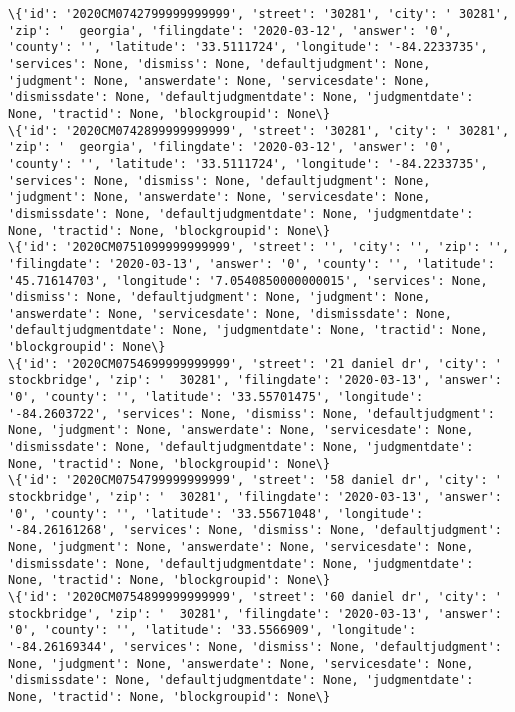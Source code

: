 \documentclass[11pt]{article}
\begin{document}
\begin{Verbatim}[commandchars=\\\{\}]
\{'id': '2020CM0742799999999999', 'street': '30281', 'city': ' 30281', 'zip': '  georgia', 'filingdate': '2020-03-12', 'answer': '0', 'county': '', 'latitude': '33.5111724', 'longitude': '-84.2233735', 'services': None, 'dismiss': None, 'defaultjudgment': None, 'judgment': None, 'answerdate': None, 'servicesdate': None, 'dismissdate': None, 'defaultjudgmentdate': None, 'judgmentdate': None, 'tractid': None, 'blockgroupid': None\}
\{'id': '2020CM0742899999999999', 'street': '30281', 'city': ' 30281', 'zip': '  georgia', 'filingdate': '2020-03-12', 'answer': '0', 'county': '', 'latitude': '33.5111724', 'longitude': '-84.2233735', 'services': None, 'dismiss': None, 'defaultjudgment': None, 'judgment': None, 'answerdate': None, 'servicesdate': None, 'dismissdate': None, 'defaultjudgmentdate': None, 'judgmentdate': None, 'tractid': None, 'blockgroupid': None\}
\{'id': '2020CM0751099999999999', 'street': '', 'city': '', 'zip': '', 'filingdate': '2020-03-13', 'answer': '0', 'county': '', 'latitude': '45.71614703', 'longitude': '7.0540850000000015', 'services': None, 'dismiss': None, 'defaultjudgment': None, 'judgment': None, 'answerdate': None, 'servicesdate': None, 'dismissdate': None, 'defaultjudgmentdate': None, 'judgmentdate': None, 'tractid': None, 'blockgroupid': None\}
\{'id': '2020CM0754699999999999', 'street': '21 daniel dr', 'city': '  stockbridge', 'zip': '  30281', 'filingdate': '2020-03-13', 'answer': '0', 'county': '', 'latitude': '33.55701475', 'longitude': '-84.2603722', 'services': None, 'dismiss': None, 'defaultjudgment': None, 'judgment': None, 'answerdate': None, 'servicesdate': None, 'dismissdate': None, 'defaultjudgmentdate': None, 'judgmentdate': None, 'tractid': None, 'blockgroupid': None\}
\{'id': '2020CM0754799999999999', 'street': '58 daniel dr', 'city': '  stockbridge', 'zip': '  30281', 'filingdate': '2020-03-13', 'answer': '0', 'county': '', 'latitude': '33.55671048', 'longitude': '-84.26161268', 'services': None, 'dismiss': None, 'defaultjudgment': None, 'judgment': None, 'answerdate': None, 'servicesdate': None, 'dismissdate': None, 'defaultjudgmentdate': None, 'judgmentdate': None, 'tractid': None, 'blockgroupid': None\}
\{'id': '2020CM0754899999999999', 'street': '60 daniel dr', 'city': '  stockbridge', 'zip': '  30281', 'filingdate': '2020-03-13', 'answer': '0', 'county': '', 'latitude': '33.5566909', 'longitude': '-84.26169344', 'services': None, 'dismiss': None, 'defaultjudgment': None, 'judgment': None, 'answerdate': None, 'servicesdate': None, 'dismissdate': None, 'defaultjudgmentdate': None, 'judgmentdate': None, 'tractid': None, 'blockgroupid': None\}

\end{Verbatim}
\end{document}
